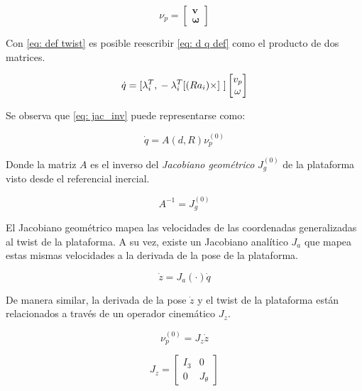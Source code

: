 \begin{equation}\label{eq: def twist}
 \nu_p = \begin{bmatrix}
        \mathbf v \\
        \boldsymbol \omega
       \end{bmatrix}
\end{equation}

Con \eqref{eq: def twist} es posible 
reescribir \eqref{eq: d q def} como el producto de dos 
matrices.

\begin{equation} \label{eq: jac_inv}
\dot{q} = [\lambda_i^T, \\ -\lambda_i^T [(Ra_i)\times]\ ] \begin{bmatrix}
v_p\\
\omega
\end{bmatrix}
\end{equation}

Se observa que \ref{eq: jac_inv} puede 
representarse como:

\begin{equation} \label{eq: jac_g}
\dot{q} = A(d,R) \nu_p^{(0)}
\end{equation}

Donde la matriz $A$ es el inverso del 
\emph{Jacobiano geométrico} 
$J_g^{(0)}$ de la plataforma 
visto desde el referencial inercial. 

\begin{equation}
 A^{-1} = J_g^{(0)}
\end{equation}



El Jacobiano geométrico mapea las velocidades 
de las coordenadas generalizadas al twist de 
la plataforma.
A su vez, existe un Jacobiano analítico $J_a$ que mapea
estas mismas velocidades a la derivada de la pose
de la plataforma.

\begin{equation} \label{eq: jac_a}
\dot{z} = J_a(\cdot)\dot{q}
\end{equation}


De manera similar, la derivada de la pose $\dot z$
y el twist de la plataforma están relacionados 
a través de un operador cinemático $J_z$.

\begin{equation}\label{eq: kinematic operator mapping}
\nu_p^{(0)} = J_z\dot{z}
\end{equation}

\begin{equation}
 J_z = \begin{bmatrix}
        I_3 & 0\\
        0 & J_\theta
       \end{bmatrix}
\end{equation}

